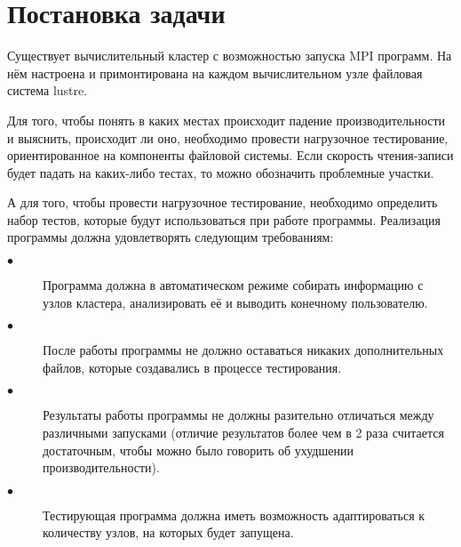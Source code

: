 \section{Постановка задачи}
\label{sec:Chapter1} 


Существует вычислительный кластер с возможностью запуска MPI программ. На нём настроена и примонтирована
на каждом вычислительном узле файловая система lustre.

Для того, чтобы понять в каких местах происходит падение производительности и выяснить, происходит ли оно, необходимо провести нагрузочное тестирование, ориентированное на компоненты файловой системы. Если скорость чтения-записи будет падать на каких-либо тестах, то можно обозначить проблемные участки. 

А для того, чтобы провести нагрузочное тестирование, необходимо определить набор тестов, которые
будут использоваться при работе программы. Реализация программы должна удовлетворять следующим требованиям:

\begin{description}
    \item[$\bullet$] Программа должна в автоматическом режиме собирать информацию с узлов кластера,
    анализировать её и выводить конечному пользователю.
    
    \item[$\bullet$] После работы программы не должно оставаться никаких дополнительных файлов, которые
    создавались в процессе тестирования.
    
    \item[$\bullet$] Результаты работы программы не должны разительно отличаться между различными
    запусками (отличие результатов более чем в 2 раза считается достаточным, чтобы можно было говорить об
    ухудшении производительности).

    \item[$\bullet$] Тестирующая программа должна иметь возможность адаптироваться к количеству узлов, на которых будет запущена.
\end{description}
